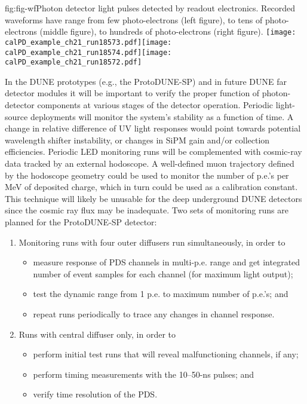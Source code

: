 %
 \begin{cdrfigure}{fig:fig-wf}{Photon detector light pulses detected by readout electronics. Recorded waveforms have range from few photo-electrons (left figure), to tens of photo-electrons (middle figure), to hundreds of photo-electrons (right figure).}
\texttt{[image: calPD\_example\_ch21\_run18573.pdf]}\texttt{[image: calPD\_example\_ch21\_run18574.pdf]}\texttt{[image: calPD\_example\_ch21\_run18572.pdf]}
\end{cdrfigure}
%
In the DUNE prototypes (e.g., the ProtoDUNE-SP) and in future DUNE far detector modules it will be important to 
verify the proper function of photon-detector components
at various stages of the detector operation. 
Periodic light-source deployments will monitor the system's stability as a function of time. A change in relative difference of UV light responses would point towards potential wavelength shifter instability, 
or changes in SiPM gain and/or collection efficiencies. %
Periodic LED monitoring runs will be complemented 
with cosmic-ray data tracked by an external hodoscope. 
A well-defined muon trajectory defined by the hodoscope geometry could be used to monitor the number of p.e.'s per MeV of deposited charge, which in turn 
could be used as a calibration constant. This technique will likely be unusable 
for the deep underground DUNE detectors since the cosmic ray flux may be inadequate. %
	Two sets of monitoring runs are planned for the ProtoDUNE-SP detector: 
\begin{enumerate}
\item Monitoring runs with four outer diffusers run simultaneously, in order to
   \begin{itemize}
   \item measure response of PDS channels in multi-p.e. range and get integrated number of event samples for each channel (for maximum light output);
   \item test  the dynamic range from 1 p.e. to maximum number of p.e.'s; and
   \item repeat runs periodically to trace any changes in channel response.
    \end{itemize}
\item Runs with central diffuser only, in order to
   \begin{itemize}
   \item perform initial test runs that will reveal malfunctioning channels, if any;
   \item perform timing measurements with the 10--50-ns pulses; and
    \item verify time resolution of the PDS.
   \end{itemize}
\end{enumerate}

